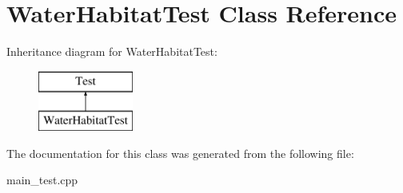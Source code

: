 \hypertarget{class_water_habitat_test}{}\section{Water\+Habitat\+Test Class Reference}
\label{class_water_habitat_test}
Inheritance diagram for Water\+Habitat\+Test\+:\begin{figure}[H]
\begin{center}
\leavevmode
\includegraphics[height=2.000000cm]{class_water_habitat_test}
\end{center}
\end{figure}


The documentation for this class was generated from the following file\+:\begin{DoxyCompactItemize}
\item 
main\+\_\+test.\+cpp\end{DoxyCompactItemize}
